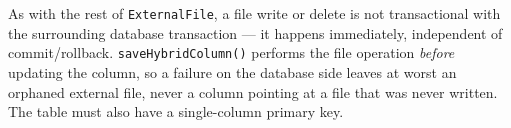 \begin{warnbox}
As with the rest of \texttt{ExternalFile}, a file write or delete is not transactional with the surrounding database transaction --- it happens immediately, independent of commit/rollback. \texttt{saveHybridColumn()} performs the file operation \emph{before} updating the column, so a failure on the database side leaves at worst an orphaned external file, never a column pointing at a file that was never written. The table must also have a single-column primary key.
\end{warnbox}
